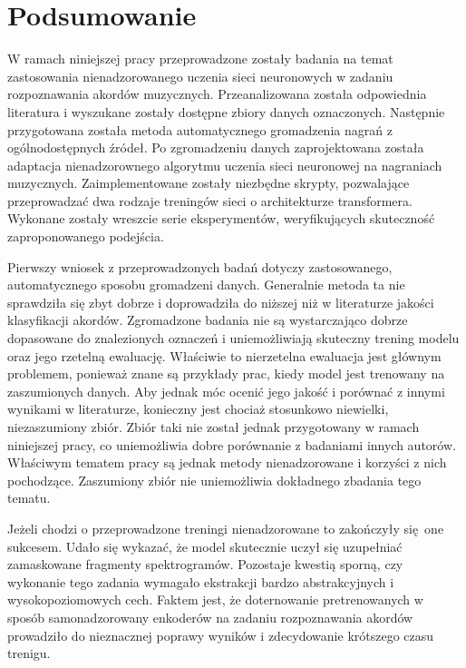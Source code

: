 \chapter{Podsumowanie} \label{chapter:summary}

W ramach niniejszej pracy przeprowadzone zostały badania na temat zastosowania nienadzorowanego uczenia sieci neuronowych w zadaniu rozpoznawania akordów muzycznych. Przeanalizowana została odpowiednia literatura i wyszukane zostały dostępne zbiory danych oznaczonych. Następnie przygotowana została metoda automatycznego gromadzenia nagrań z ogólnodostępnych źródeł. Po zgromadzeniu danych zaprojektowana została adaptacja nienadzorownego algorytmu uczenia sieci neuronowej na nagraniach muzycznych. Zaimplementowane zostały niezbędne skrypty, pozwalające przeprowadzać dwa rodzaje treningów sieci o architekturze transformera. Wykonane zostały wreszcie serie eksperymentów, weryfikujących skuteczność zaproponowanego podejścia.

Pierwszy wniosek z przeprowadzonych badań dotyczy zastosowanego, automatycznego sposobu gromadzeni danych. Generalnie metoda ta nie sprawdziła się zbyt dobrze i doprowadziła do niższej niż w literaturze jakości klasyfikacji akordów. Zgromadzone badania nie są wystarczająco dobrze dopasowane do znalezionych oznaczeń i uniemożliwiają skuteczny trening modelu oraz jego rzetelną ewaluację. Właściwie to nierzetelna ewaluacja jest głównym problemem, ponieważ znane są przykłady prac, kiedy model jest trenowany na zaszumionych danych. Aby jednak móc ocenić jego jakość i porównać z innymi wynikami w literaturze, konieczny jest chociaż stosunkowo niewielki, niezaszumiony zbiór. Zbiór taki nie został jednak przygotowany w ramach niniejszej pracy, co uniemożliwia dobre porównanie z badaniami innych autorów. Właściwym tematem pracy są jednak metody nienadzorowane i korzyści z nich pochodzące. Zaszumiony zbiór nie uniemożliwia dokładnego zbadania tego tematu.

Jeżeli chodzi o przeprowadzone treningi nienadzorowane to zakończyły się one sukcesem. Udało się wykazać, że model skutecznie uczył się uzupełniać zamaskowane fragmenty spektrogramów. Pozostaje kwestią sporną, czy wykonanie tego zadania wymagało ekstrakcji bardzo abstrakcyjnych i wysokopoziomowych cech. Faktem jest, że doternowanie pretrenowanych w sposób samonadzorowany enkoderów na zadaniu rozpoznawania akordów prowadziło do nieznacznej poprawy wyników i zdecydowanie krótszego czasu trenigu.

